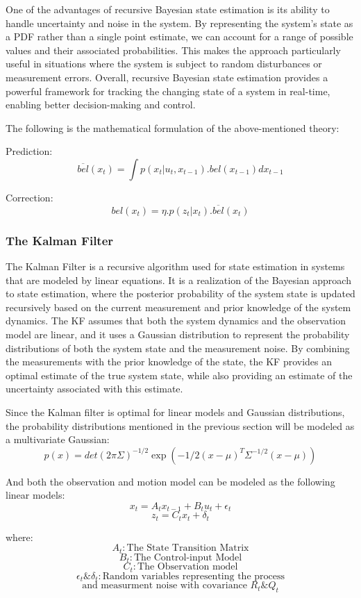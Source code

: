 \documentclass[11pt]{article}
\begin{document}
One of the advantages of recursive Bayesian state estimation is its ability to handle uncertainty and noise in the system. By representing the system's state as a PDF rather than a single point estimate, we can account for a range of possible values and their associated probabilities. This makes the approach particularly useful in situations where the system is subject to random disturbances or measurement errors. Overall, recursive Bayesian state estimation provides a powerful framework for tracking the changing state of a system in real-time, enabling better decision-making and control.

The following is the mathematical formulation of the above-mentioned theory:

Prediction:
$$\overline{bel}(x_t) = \int p(x_t | u_t, x_{t-1}) .bel(x_{t-1}) dx_{t-1}$$ 

Correction:
$$bel(x_t) = \eta . p(z_t | x_t) .\overline{bel}(x_t)$$
		
		\subsubsection{The Kalman Filter}
The Kalman Filter is a recursive algorithm used for state estimation in systems that are modeled by linear equations. It is a realization of the Bayesian approach to state estimation, where the posterior probability of the system state is updated recursively based on the current measurement and prior knowledge of the system dynamics. The KF assumes that both the system dynamics and the observation model are linear, and it uses a Gaussian distribution to represent the probability distributions of both the system state and the measurement noise. By combining the measurements with the prior knowledge of the state, the KF provides an optimal estimate of the true system state, while also providing an estimate of the uncertainty associated with this estimate.		

	Since the Kalman filter is optimal for linear models and Gaussian distributions, the probability distributions mentioned in the previous section will be modeled as a multivariate Gaussian:
	$$p(x) = det(2\pi \Sigma)^{-1/2} \exp \left( -1/2 (x- \mu)^T \Sigma^{-1/2} (x- \mu) \right)$$ 
	
	And both the observation and motion model can be modeled as the following linear models:
	$$x_t = A_t x_{t-1} + B_t u_t + \epsilon_t$$
	$$z_t = C_t x_t + \delta_t$$
	
	where:
	$$A_t: \textrm{The State Transition Matrix}$$
	$$B_t: \textrm{The Control-input Model}$$
	$$C_t: \textrm{The Observation model}$$
	$$\epsilon_t \& \delta_t: \textrm{Random variables representing the process}$$
	$$ \textrm{and measurment noise with covariance } R_t \& Q_t$$
	
\end{document}
